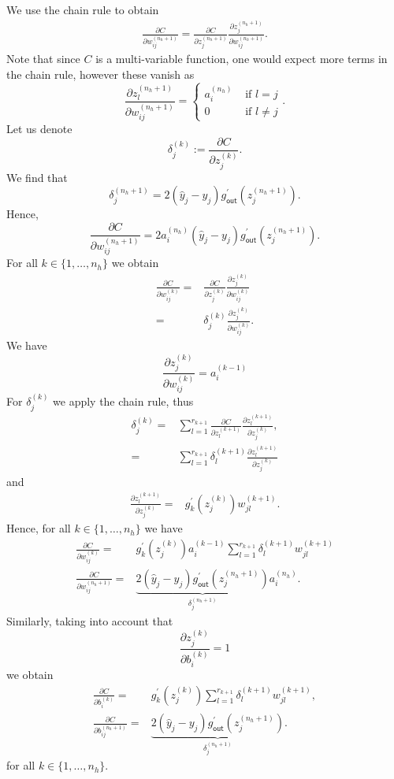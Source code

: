 \documentclass[12pt]{amsart}
\theoremstyle{remark}
\theoremstyle{definition}
\numberwithin{equation}{section}
\begin{document}
We use the chain rule to obtain 
\begin{align*}
\frac{\partial C}{ \partial w_{ij}^{(n_h+1)}} = \frac{\partial C}{\partial z_j^{(n_h+1)}} \frac{\partial z_j^{(n_h+1)}}{ \partial w_{ij}^{(n_h+1)}}.
\end{align*}
Note that since $C$ is a multi-variable function, one would expect more terms in the chain rule, however these vanish as
$$\frac{\partial z_l^{(n_h+1)}}{ \partial w_{ij}^{(n_h+1)}} = \begin{cases} a_i^{(n_h)} & \mbox{ if } l=j \\ 0 & \mbox{ if } l \neq j\end{cases}.$$
Let us denote 
$$ \delta_j^{(k)}:= \frac{\partial C}{\partial z_j^{(k)}}.$$
We find that 
$$  \delta_j^{(n_h+1)}= 2(\widehat{y}_j - y_j)g^{\prime}_{\mathsf{out}}(z_j^{(n_h+1)}).$$
Hence, 
$$\frac{\partial C}{ \partial w_{ij}^{(n_h+1)}} = 2a_i^{(n_h)}(\widehat{y}_j - y_j)g^{\prime}_{\mathsf{out}}(z_j^{(n_h+1)}).
$$
For all $k \in \{1, \ldots, n_h\}$ we obtain
\begin{align*}
\frac{\partial C}{ \partial w_{ij}^{(k)}} =& \frac{\partial C}{\partial z_j^{(k)}} \frac{\partial z_j^{(k)}}{ \partial w_{ij}^{(k)}}\\
=& \delta_j^{(k)} \frac{\partial z_j^{(k)}}{ \partial w_{ij}^{(k)}}.
\end{align*}
We have
$$
\frac{\partial z_j^{(k)}}{ \partial w_{ij}^{(k)}} = a_i^{(k-1)}$$
For $\delta_j^{(k)}$ we apply the chain rule, thus
\begin{align*}
\delta_j^{(k)} =& \sum_{l=1}^{r_{k+1}} \frac{\partial C}{\partial z_l^{(k+1)}} \frac{\partial z_l^{(k+1)}}{\partial z_{j}^{(k)}},\\
=& \sum_{l=1}^{r_{k+1}}\delta_l^{(k+1)} \frac{\partial z_l^{(k+1)}} {\partial z_{j}^{(k)}}
\end{align*}
and
\begin{align*}
\frac{\partial z_l^{(k+1)}} {\partial z_{j}^{(k)}}
=& g_k^{\prime}(z_j^{(k)})w_{jl}^{(k+1)}.
\end{align*}
Hence, for all $k \in \{1, \ldots, n_h\}$ we have
\begin{align*}
\frac{\partial C}{ \partial w_{ij}^{(k)}} =&g_k^{\prime}(z_j^{(k)}) a_i^{(k-1)} \sum_{l=1}^{r_{k+1}}\delta_l^{(k+1)} w_{jl}^{(k+1)}\\
\frac{\partial C}{ \partial w_{ij}^{(n_h+1)}} =& \underbrace{2(\widehat{y}_j - y_j)g^{\prime}_{\mathsf{out}}(z_j^{(n_h+1)})}_{\delta_j^{(n_h+1)}}a_i^{(n_h)}.
\end{align*}
Similarly, taking into account that 
$$\frac{\partial z_j^{(k)}}{ \partial b_{i}^{(k)}}=1$$
we obtain 
\begin{align*}
\frac{\partial C}{ \partial b_{i}^{(k)}} =&g_k^{\prime}(z_j^{(k)})  \sum_{l=1}^{r_{k+1}}\delta_l^{(k+1)} w_{jl}^{(k+1)},\\
\frac{\partial C}{ \partial b_{ij}^{(n_h+1)}} =& \underbrace{2(\widehat{y}_j - y_j)g^{\prime}_{\mathsf{out}}(z_j^{(n_h+1)})}_{\delta_j^{(n_h+1)}}.
\end{align*}
for all $k \in \{1, \ldots, n_h\}$.
\end{document}
